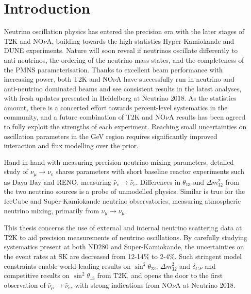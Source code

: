 \chapter{Introduction}
\label{chap:intro}
Neutrino oscillation physics has entered the precision era with the later stages of T2K\cite{t2k_2017} and NO$\nu$A\cite{nova_2018}, building towards the high statistics Hyper-Kamiokande\cite{hyperk} and DUNE\cite{dune} experiments. Nature will soon reveal if neutrinos oscillate differently to anti-neutrinos, the ordering of the neutrino mass states, and the completeness of the PMNS parameterisation\cite{p1,p2,mns}. Thanks to excellent beam performance with increasing power, both T2K and NO$\nu$A have successfully run in neutrino and anti-neutrino dominated beams and see consistent results in the latest analyses, with fresh updates presented in Heidelberg at Neutrino 2018\cite{t2k_neutrino2018, nova_neutrino2018}. As the statistics amount, there is a concerted effort towards percent-level systematics in the community, and a future combination of T2K and NO$\nu$A results has been agreed\cite{t2k_nova, t2k_nova_meet} to fully exploit the strengths of each experiment. Reaching small uncertainties on oscillation parameters in the GeV region requires significantly improved interaction and flux modelling over the prior\cite{t2k_ii, dune_exp}.

Hand-in-hand with measuring precision neutrino mixing parameters, detailed study of $\nu_\mu \rightarrow \nu_e$ shares parameters with short baseline reactor experiments such as Daya-Bay\cite{daya_bay} and RENO\cite{reno}, measuring $\bar{\nu}_e\rightarrow \bar{\nu}_e$. Differences in $\theta_{13}$ and $\Delta m^2_{32}$ from the two neutrino sources is a probe of unmodelled physics. Similar is true for the IceCube\cite{icecube} and Super-Kamiokande\cite{superk} neutrino observatories, measuring atmospheric neutrino mixing, primarily from $\nu_\mu \rightarrow \nu_\mu$. 

This thesis concerns the use of external and internal neutrino scattering data at T2K to aid precision measurements of neutrino oscillations. By carefully studying systematics present at both ND280 and Super-Kamiokande, the uncertainties on the event rates at SK are decreased from 12-14\% to 2-4\%. Such stringent model constraints enable world-leading results on $\sin^2\theta_{23}$, $\Delta m^2_{32}$ and $\delta_{CP}$ and competitive results on $\sin^2\theta_{13}$ from T2K\cite{pdg_2017}, and opens the door to the first observation of $\bar{\nu}_\mu \rightarrow \bar{\nu}_e$, with strong indications from NO$\nu$A at Neutrino 2018\cite{nova_neutrino2018}.

